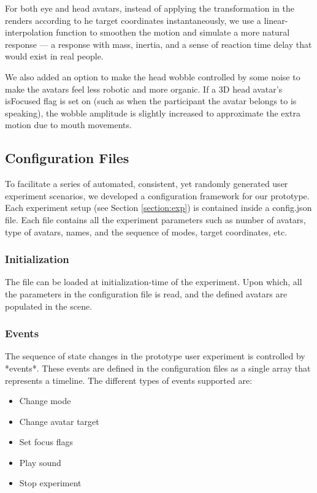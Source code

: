 For both eye and head avatars, instead of applying the transformation in the renders according to he target coordinates instantaneously, we use a linear-interpolation function to smoothen the motion and simulate a more natural response --- a response with mass, inertia, and a sense of reaction time delay that would exist in real people.

We also added an option to make the head wobble controlled by some noise to make the avatars feel less robotic and more organic. If a 3D head avatar’s isFocused flag is set on (such as when the participant the avatar belongs to is speaking), the wobble amplitude is slightly increased to approximate the extra motion due to mouth movements.

\subsection{Configuration Files}\label{section:config}

To facilitate a series of automated, consistent, yet randomly generated user experiment scenarios, we developed a configuration framework for our prototype. Each experiment setup (see Section \ref{section:exp}) is contained inside a config.json file. Each file contains all the experiment parameters such as number of avatars, type of avatars, names, and the sequence of modes, target coordinates, etc. 

\subsubsection{Initialization}

The file can be loaded at initialization-time of the experiment. Upon which, all the parameters in the configuration file is read, and the defined avatars are populated in the scene. 

\subsubsection{Events}

The sequence of state changes in the prototype user experiment is controlled by *events*. These events are defined in the configuration files as a single array that represents a timeline. The different types of events supported are:

\begin{itemize}
    \item Change mode
    \item Change avatar target
    \item Set focus flags
    \item Play sound
    \item Stop experiment
\end{itemize}

